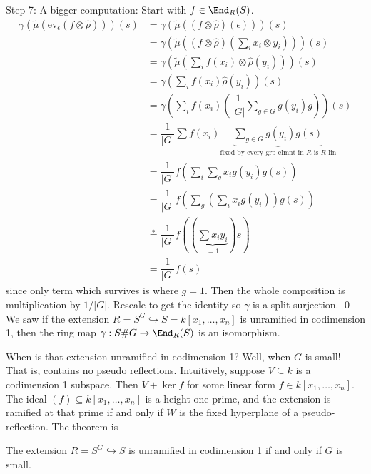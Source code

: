 Step 7: A bigger computation: Start with $f \in \End_R(S)$. 
	\[
	\begin{split}
	\gamma(\tilde{\mu}(\text{ev}_\epsilon(f \otimes \hat{\rho})))(s)&= \gamma(\tilde{\mu}( (f \otimes \hat{\rho})(\epsilon)))(s) \\
	&= \gamma(\tilde{\mu}( (f \otimes \hat{\rho})( \sum_i x_i \otimes y_i)))(s) \\
	&= \gamma(\tilde{\mu}( \sum_i f(x_i) \otimes \hat{\rho}(y_i)))(s) \\
	&= \gamma( \sum_i f(x_i) \hat{\rho}(y_i))(s) \\
	&= \gamma( \sum_i f(x_i) (\dfrac{1}{|G|} \sum_{g \in G} g(y_i) g))(s) \\
	&= \dfrac{1}{|G|} \sum f(x_i) \underbrace{\sum_{g \in G} g(y_i) g(s)}_{\text{fixed by every grp elmnt in }R \text{ is }R\text{-lin}} \\
	&= \dfrac{1}{|G|} f \left( \sum_i \sum_g x_i g(y_i) g(s) \right) \\
	&= \dfrac{1}{|G|} f \left( \sum_g \left( \sum_i x_i g(y_i) \right)  g(s) \right) \\
	&\stackrel{*}{=} \dfrac{1}{|G|} f \left( \left( \underbrace{\sum x_i y_i}_{=1} \right) s \right) \\
	&= \dfrac{1}{|G|} f(s)
	\end{split}
	\]
since only term which survives is where $g=1$. Then the whole composition is multiplication by $1/|G|$. Rescale to get the identity so $\gamma$ is a split surjection. \qed \\




We saw if the extension $R=S^G \hookrightarrow S=k[x_1,\ldots,x_n]$ is unramified in codimension 1, then the ring map $\gamma: S\#G \to \End_R(S)$ is an isomorphism. 

When is that extension unramified in codimension 1? Well, when $G$ is small! That is, contains no pseudo reflections. Intuitively, suppose $V \subseteq k$ is a codimension 1 subspace. Then $V+ \ker f$ for some linear form $f \in k[x_1,\ldots,x_n]$. The ideal $(f) \subseteq k[x_1,\ldots,x_n]$ is a height-one prime, and the extension is ramified at that prime if and only if $W$ is the fixed hyperplane of a pseudo-reflection. The theorem is


\begin{thm}[Auslander, 1962]
The extension $R= S^G \hookrightarrow S$ is unramified in codimension 1 if and only if $G$ is small. 
\end{thm}

